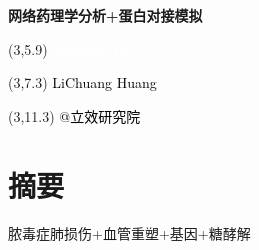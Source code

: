 \documentclass[
]{article}
\author{}
\date{\vspace{-2.5em}}
\begin{document}
\begin{titlepage} 
\begin{center} \textbf{\Huge
网络药理学分析+蛋白对接模拟} \vspace{4em}
\begin{textblock}{10}(3,5.9) \huge
\textbf{\textcolor{white}{2024-01-10}}
\end{textblock} \begin{textblock}{10}(3,7.3)
\Large \textcolor{black}{LiChuang Huang}
\end{textblock} \begin{textblock}{10}(3,11.3)
\Large \textcolor{black}{@立效研究院}
\end{textblock} \end{center} \end{titlepage}
\restoregeometry


\tableofcontents

\listoffigures

\listoftables

\newpage


\hypertarget{abstract}{%
\section{摘要}\label{abstract}}

脓毒症肺损伤+血管重塑+基因+糖酵解
\end{document}
